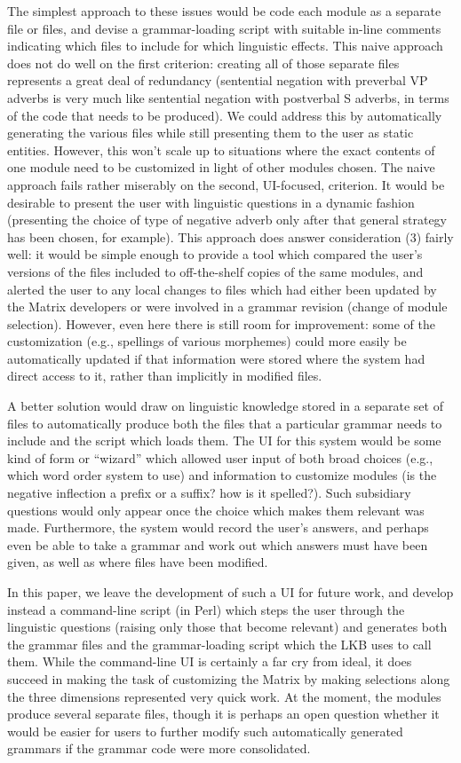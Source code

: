 \documentclass[11pt]{article}
\begin{document}
The simplest approach to these issues would be code each module as a
separate file or files, and devise a grammar-loading script with
suitable in-line comments indicating which files to include for which
linguistic effects.  This naive approach does not do well on the first
criterion: creating all of those separate files represents a great
deal of redundancy (sentential negation with preverbal VP adverbs is
very much like sentential negation with postverbal S adverbs, in terms
of the code that needs to be produced).  We could address this by
automatically generating the various files while still presenting them
to the user as static entities.  However, this won't scale up to
situations where the exact contents of one module need to be
customized in light of other modules chosen.  The naive approach fails
rather miserably on the second, UI-focused, criterion.  It would be
desirable to present the user with linguistic questions in a dynamic
fashion (presenting the choice of type of negative adverb only after
that general strategy has been chosen, for example).  This approach
does answer consideration (3) fairly well: it would be simple enough to
provide a tool which compared the user's versions of the files
included to off-the-shelf copies of the same modules, and alerted the
user to any local changes to files which had either been updated by
the Matrix developers or were involved in a grammar revision (change
of module selection).  However, even here there is still room for improvement:
some of the customization (e.g., spellings of various morphemes) could
more easily be automatically updated if that information were stored
where the system had direct access to it, rather than implicitly in
modified files.

A better solution would draw on linguistic knowledge stored in a
separate set of files to automatically produce both the files that a
particular grammar needs to include and the script which loads them.
The UI for this system would be some kind of form or ``wizard'' which
allowed user input of both broad choices (e.g., which word order
system to use) and information to customize modules (is the negative
inflection a prefix or a suffix? how is it spelled?).  Such subsidiary
questions would only appear once the choice which makes them relevant
was made.  Furthermore, the system would record the user's answers, and
perhaps even be able to take a grammar and work out which answers must
have been given, as well as where files have been modified.  

In this paper, we leave the development of such a UI for future work,
and develop instead a command-line script (in Perl) which steps the
user through the linguistic questions (raising only those that become
relevant) and generates both the grammar files and the grammar-loading
script which the LKB uses to call them.  While the command-line UI is
certainly a far cry from ideal, it does succeed in making the task of
customizing the Matrix by making selections along the three dimensions
represented very quick work.  At the moment, the modules produce
several separate files, though it is perhaps an open question whether
it would be easier for users to further modify such automatically
generated grammars if the grammar code were more consolidated.
\end{document}
